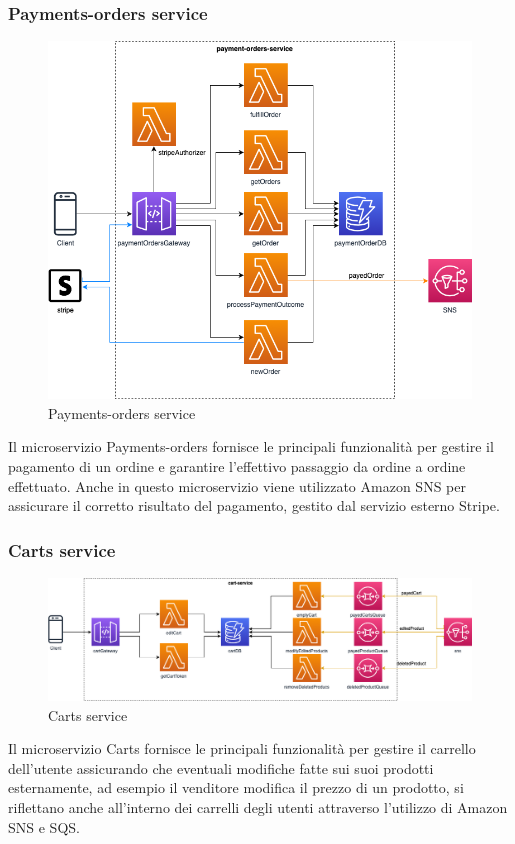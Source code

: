 \subsubsection{Payments-orders service}
\begin{figure}[H]
	\centering
	\includegraphics[scale=0.4]{Immagini/Backend/AWSPaymentOrders.png}
	\caption{Payments-orders service}
	\label{fig:Payment-orders}
\end{figure}
Il microservizio Payments-orders fornisce le principali funzionalità per gestire il pagamento di un ordine e garantire l'effettivo passaggio da ordine a ordine effettuato. Anche in questo microservizio viene utilizzato Amazon SNS per assicurare il corretto risultato del pagamento, gestito dal servizio esterno Stripe.

\subsubsection{Carts service}
\begin{figure}[H]
	\centering
	\includegraphics[scale=0.4]{Immagini/Backend/AWSCart.png}
	\caption{Carts service}
	\label{fig:Cart}
\end{figure}
Il microservizio Carts fornisce le principali funzionalità per gestire il carrello dell'utente assicurando che eventuali modifiche fatte sui suoi prodotti esternamente, ad esempio il venditore modifica il prezzo di un prodotto, si riflettano anche all'interno dei carrelli degli utenti attraverso l'utilizzo di Amazon SNS e SQS.

